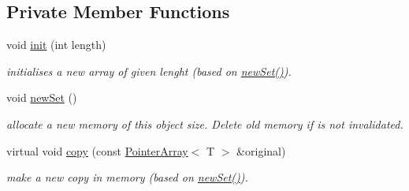 \subsection*{Private Member Functions}
\begin{DoxyCompactItemize}
\item 
\hypertarget{classparray_1_1PointerArray_ac45bf71fe7c82789e7dd135aece4692a}{void \hyperlink{classparray_1_1PointerArray_ac45bf71fe7c82789e7dd135aece4692a}{init} (int length)}\label{classparray_1_1PointerArray_ac45bf71fe7c82789e7dd135aece4692a}

\begin{DoxyCompactList}\small\item\em initialises a new array of given lenght (based on \hyperlink{classparray_1_1PointerArray_afc7385141e8217e1ebe3b2a3a3a40679}{new\-Set()}). \end{DoxyCompactList}\item 
\hypertarget{classparray_1_1PointerArray_afc7385141e8217e1ebe3b2a3a3a40679}{void \hyperlink{classparray_1_1PointerArray_afc7385141e8217e1ebe3b2a3a3a40679}{new\-Set} ()}\label{classparray_1_1PointerArray_afc7385141e8217e1ebe3b2a3a3a40679}

\begin{DoxyCompactList}\small\item\em allocate a new memory of this object size. Delete old memory if is not invalidated. \end{DoxyCompactList}\item 
\hypertarget{classparray_1_1PointerArray_a3010540e156076377ffd4428b05e1ac2}{virtual void \hyperlink{classparray_1_1PointerArray_a3010540e156076377ffd4428b05e1ac2}{copy} (const \hyperlink{classparray_1_1PointerArray}{Pointer\-Array}$<$ T $>$ \&original)}\label{classparray_1_1PointerArray_a3010540e156076377ffd4428b05e1ac2}

\begin{DoxyCompactList}\small\item\em make a new copy in memory (based on \hyperlink{classparray_1_1PointerArray_afc7385141e8217e1ebe3b2a3a3a40679}{new\-Set()}). \end{DoxyCompactList}\end{DoxyCompactItemize}
